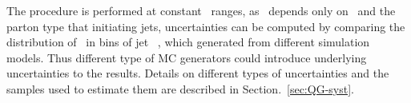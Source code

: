 The procedure is performed at constant \pt\ ranges, as \ntrk~depends only on \pt\ and the parton type that initiating jets, uncertainties can be computed by comparing the distribution of \ntrk~in bins of jet \pt~, which generated from different simulation models. Thus different type of MC generators could introduce underlying uncertainties to the results. Details on different types of uncertainties and the samples used to estimate them are described in Section.~\ref{sec:QG-syst}. 


%
%
%
\FloatBarrier